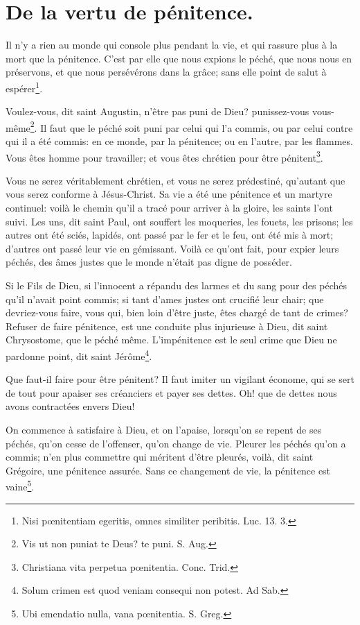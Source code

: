 \documentclass[instructions.tex]{subfiles}
\begin{document}
 
\chapter{De la vertu de pénitence.}
 
\primo Il n’y a rien au monde qui console plus pendant la vie, et qui rassure plus à la mort que la pénitence. C’est par elle que nous expions le péché, que nous nous en préservons, et que nous persévérons dans la grâce; sans elle point de salut à espérer\footnote{Nisi pœnitentiam egeritis, omnes similiter peribitis. Luc. 13. 3.}.
 
Voulez-vous, dit saint Augustin, n’être pas puni de Dieu? punissez-vous vous-même\footnote{Vis ut non puniat te Deus? te puni. S. Aug.}. Il faut que le péché soit puni par celui qui l’a commis, ou par celui contre qui il a été commis: en ce monde, par la pénitence; ou en l’autre, par les flammes. Vous êtes homme pour travailler; et vous êtes chrétien pour être pénitent\footnote{Christiana vita perpetua pœnitentia. Conc. Trid.}.
 
Vous ne serez véritablement chrétien, et vous ne serez prédestiné, qu’autant que vous serez conforme à Jésus-Christ. Sa vie a été une pénitence et un martyre continuel: voilà le chemin qu’il a tracé pour arriver à la gloire, les saints l’ont suivi. Les uns, dit saint Paul, ont souffert les moqueries, les fouets, les prisons; les autres ont été sciés, lapidés, ont passé par le fer et le feu, ont été mis à mort; d’autres ont passé leur vie en gémissant. Voilà ce qu’ont fait, pour expier leurs péchés, des âmes justes que le monde n’était pas digne de posséder.
 
Si le Fils de Dieu, si l’innocent a répandu des larmes et du sang pour des péchés qu’il n’avait point commis; si tant d’ames justes ont crucifié leur chair; que devriez-vous faire, vous qui, bien loin d’être juste, êtes chargé de tant de crimes? Refuser de faire pénitence, est une conduite plus injurieuse à Dieu, dit saint Chrysostome, que le péché même. L’impénitence est le seul crime que Dieu ne pardonne point, dit saint Jérôme\footnote{Solum crimen est quod veniam consequi non potest. Ad Sab.}.
 
\secundo Que faut-il faire pour être pénitent? Il faut imiter un vigilant économe, qui se sert de tout pour apaiser ses créanciers et payer ses dettes. Oh! que de dettes nous avons contractées envers Dieu!
 
On commence à satisfaire à Dieu, et on l’apaise, lorsqu’on se repent de ses péchés, qu’on cesse de l’offenser, qu’on change de vie. Pleurer les péchés qu’on a commis; n’en plus commettre qui méritent d’être pleurés, voilà, dit saint Grégoire, une pénitence assurée. Sans ce changement de vie, la pénitence est vaine\footnote{Ubi emendatio nulla, vana pœnitentia. S. Greg.}.
 
\end{document}
